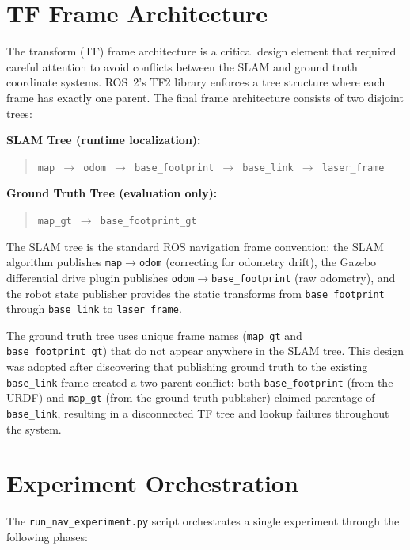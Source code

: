 \section{TF Frame Architecture}

The transform (TF) frame architecture is a critical design element that required careful attention to avoid conflicts between the SLAM and ground truth coordinate systems. ROS~2's TF2 library enforces a tree structure where each frame has exactly one parent. The final frame architecture consists of two disjoint trees:

\textbf{SLAM Tree (runtime localization):}
\begin{quote}
\small\texttt{map $\rightarrow$ odom $\rightarrow$ base\_footprint $\rightarrow$ base\_link $\rightarrow$ laser\_frame}
\end{quote}

\textbf{Ground Truth Tree (evaluation only):}
\begin{quote}
\small\texttt{map\_gt $\rightarrow$ base\_footprint\_gt}
\end{quote}

The SLAM tree is the standard ROS navigation frame convention: the SLAM algorithm publishes \texttt{map}$\rightarrow$\texttt{odom} (correcting for odometry drift), the Gazebo differential drive plugin publishes \texttt{odom}$\rightarrow$\texttt{base\_footprint} (raw odometry), and the robot state publisher provides the static transforms from \texttt{base\_footprint} through \texttt{base\_link} to \texttt{laser\_frame}.

The ground truth tree uses unique frame names (\texttt{map\_gt} and \texttt{base\_footprint\_gt}) that do not appear anywhere in the SLAM tree. This design was adopted after discovering that publishing ground truth to the existing \texttt{base\_link} frame created a two-parent conflict: both \texttt{base\_footprint} (from the URDF) and \texttt{map\_gt} (from the ground truth publisher) claimed parentage of \texttt{base\_link}, resulting in a disconnected TF tree and lookup failures throughout the system.

\section{Experiment Orchestration}

The \texttt{run\_nav\_experiment.py} script orchestrates a single experiment through the following phases:

